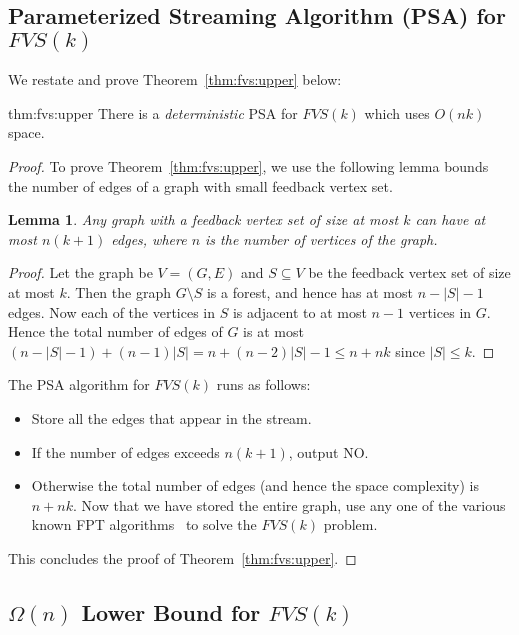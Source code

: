 \documentclass[11pt,letter]{article}
\newtheorem{lemma}[theorem]{Lemma}
\begin{document}
\subsection{Parameterized Streaming Algorithm (PSA) for $FVS(k)$}

We restate and prove Theorem~\ref{thm:fvs:upper} below:

\begin{reptheorem}{thm:fvs:upper}
There is a \emph{deterministic} PSA for $FVS(k)$ which uses $O(nk)$ space.
\end{reptheorem}



\begin{proof}
To prove Theorem~\ref{thm:fvs:upper}, we use the following lemma bounds the number of edges of a graph with small feedback vertex set.

\begin{lemma}
Any graph with a feedback vertex set of size at most $k$ can have at most $n(k+1)$ edges, where $n$ is the number of vertices of the graph.
\end{lemma}
\begin{proof}
Let the graph be $V=(G,E)$ and $S\subseteq V$ be the feedback vertex
set of size at most $k$. Then the graph $G\setminus S$ is a forest,
and hence has at most $n-|S|-1$ edges. Now each of the vertices in $S$
is adjacent to at most $n-1$ vertices in $G$. Hence the total number
of edges of $G$ is at most $(n-|S|-1)+(n-1)|S| = n+(n-2)|S|-1 \leq n+nk$ since $|S|\leq k$.
\end{proof}

\noindent The PSA algorithm for $FVS(k)$ runs as follows:
\begin{itemize}
\item Store all the edges that appear in the stream.
\item If the number of edges exceeds $n(k+1)$, output NO.
\item Otherwise the total number of edges (and hence the space complexity) is $n+nk$. Now that we have stored the entire graph, use any one of the various known FPT algorithms~\cite{DBLP:conf/swat/CaoCL10, DBLP:journals/corr/KociumakaP13} to solve the $FVS(k)$ problem.
\end{itemize}
This concludes the proof of Theorem~\ref{thm:fvs:upper}.
\end{proof}


\subsection{$\Omega(n)$ Lower Bound for $FVS(k)$}
\end{document}
